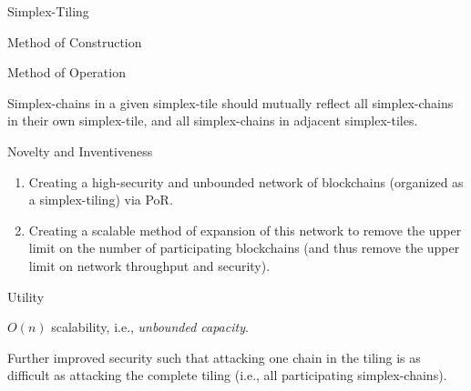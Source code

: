 \begin{section}{Simplex-Tiling}
\begin{subsection}{Method of Construction}
 \end{subsection}
 \begin{subsection}{Method of Operation}

     Simplex-chains in a given simplex-tile should mutually reflect all simplex-chains in their own simplex-tile, and all simplex-chains in adjacent simplex-tiles.

 \end{subsection}
 \begin{subsection}{Novelty and Inventiveness}

     \begin{enumerate}
         \def\labelenumi{\arabic{enumi}.}
         \tightlist
         \item
            Creating a high-security and unbounded network of blockchains (organized as a simplex-tiling) via PoR.
         \item
            Creating a scalable method of expansion of this network to remove the upper limit on the number of participating blockchains (and thus remove the upper limit on network throughput and security).
     \end{enumerate}

 \end{subsection}
 \begin{subsection}{Utility}

     $O(n)$ scalability, i.e., \emph{unbounded capacity}.

     Further improved security such that attacking one chain in the tiling is as difficult as attacking the complete tiling (i.e., all participating simplex-chains).

 \end{subsection}
\end{section}
